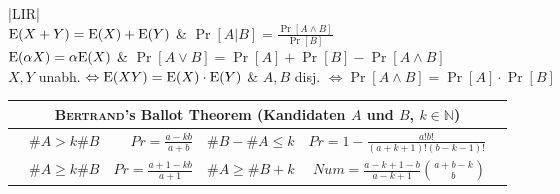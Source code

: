 \begin{expandtable}
\begin{tabularx}{\linewidth}{|LIR|}
	\hline
	 \\
	\hline
	$\text{E}(X + Y) = \text{E}(X) + \text{E}(Y)$                                & $\Pr[A \vert B] = \frac{\Pr[A \land B]}{\Pr[B]}$ \\
	$\text{E}(\alpha X) = \alpha \text{E}(X)$                              & $\Pr[A \lor B] = \Pr[A] + \Pr[B] - \Pr[A \land B]$ \\
	$X, Y$ unabh. $\Leftrightarrow \text{E}(XY) = \text{E}(X) \cdot \text{E}(Y)$ & $A, B$ disj. $\Leftrightarrow \Pr[A \land B] = \Pr[A] \cdot \Pr[B]$\\
	\hline
\end{tabularx}
\begin{tabularx}{\linewidth}{|Xlr|lrX|}
	\hline
	\multicolumn{6}{|c|}{\textsc{Bertrand}'s Ballot Theorem (Kandidaten $A$ und $B$, $k \in \mathbb{N}$)} \\
	\hline
	& $\#A > k\#B$ & $Pr = \frac{a - kb}{a + b}$ &
	$\#B - \#A \leq k$ & $Pr = 1 - \frac{a!b!}{(a + k + 1)!(b - k - 1)!}$ & \\
	
	& $\#A \geq k\#B$ & $Pr = \frac{a + 1 - kb}{a + 1}$ &
	$\#A \geq \#B + k$ & $Num = \frac{a - k + 1 - b}{a - k + 1} \binom{a + b - k}{b}$ & \\
	\hline
\end{tabularx}
\end{expandtable}
